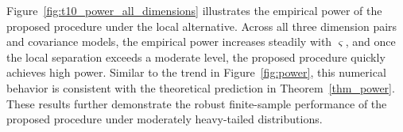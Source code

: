 \documentclass[12pt]{article}
\theoremstyle{plain}
\numberwithin{equation}{section}
\begin{document}
Figure~\ref{fig:t10_power_all_dimensions} illustrates the empirical power of the proposed procedure under the local alternative. Across all three dimension pairs and covariance models, the empirical power increases steadily with $\varsigma$, and once the local separation exceeds a moderate level, the proposed procedure quickly achieves high power. Similar to the trend in Figure~\ref{fig:power}, this numerical behavior is consistent with the theoretical prediction in Theorem~\ref{thm_power}. These results further demonstrate the robust finite-sample performance of the proposed procedure under moderately heavy-tailed distributions.

\end{document}
